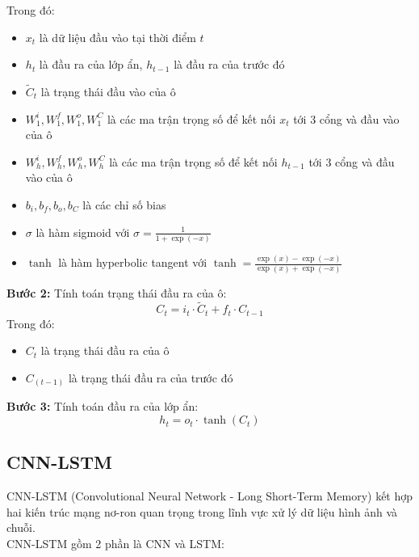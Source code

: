 \documentclass[conference]{IEEEtran}
\begin{document}
Trong đó: 
\begin{itemize}
    \item $x_t$ là dữ liệu đầu vào tại thời điểm $t$
    \item $h_t$ là đầu ra của lớp ẩn, $h_{t-1}$ là đầu ra của trước đó
    \item $\tilde{C}_t$ là trạng thái đầu vào của ô
    \item $W_1^i, W_1^f, W_1^o, W_1^C$ là các ma trận trọng số để kết nối $x_t$ tới 3 cổng và đầu vào của ô
    \item $W_h^i, W_h^f, W_h^o, W_h^C$ là các ma trận trọng số để kết nối $h_{t-1}$ tới 3 cổng và đầu vào của ô
    \item $b_i, b_f, b_o, b_C$ là các chỉ số bias
    \item $\sigma$ là hàm sigmoid với $\sigma = \frac{1}{1 + \exp(-x)}$
    \item $\tanh$ là hàm hyperbolic tangent với $\tanh = \frac{\exp(x) - \exp(-x)}{\exp(x) + \exp(-x)}$
\end{itemize}
\textbf{Bước 2:} Tính toán trạng thái đầu ra của ô:
\[C_t = i_t \cdot \tilde{C}_t + f_t \cdot C_{t-1}\]
Trong đó: 
\begin{itemize}
    \item $C_t$ là trạng thái đầu ra của ô
    \item $C_(t-1)$ là trạng thái đầu ra của trước đó
\end{itemize}
\textbf{Bước 3:} Tính toán đầu ra của lớp ẩn:
\[h_t = o_t \cdot \tanh(C_t)\]

\subsection{CNN-LSTM}
CNN-LSTM (Convolutional Neural Network - Long Short-Term Memory) kết hợp hai kiến trúc mạng nơ-ron quan trọng trong lĩnh vực xử lý dữ liệu hình ảnh và chuỗi. \cite{predictStockCNNLSTM} \\
CNN-LSTM gồm 2 phần là CNN và LSTM:
\end{document}
